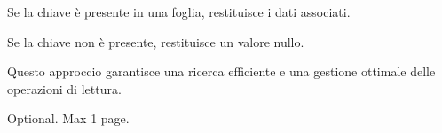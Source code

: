 \documentclass[12pt,a4paper,openright,twoside]{book}
\begin{document}
                    Se la chiave è presente in una foglia, restituisce i dati associati.

                    Se la chiave non è presente, restituisce un valore nullo.

                    Questo approccio garantisce una ricerca efficiente e una gestione ottimale delle operazioni di lettura.



\backmatter

\nocite{*} %




\begin{acknowledgements} %
Optional. Max 1 page.
\end{acknowledgements}
\end{document}
